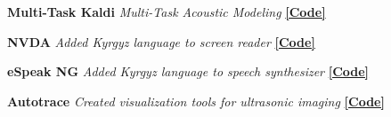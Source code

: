 \documentclass{resume} %
\begin{document}
{\textbf{Multi-Task Kaldi}} {\hfill \textit{Multi-Task Acoustic Modeling} {\hspace{2.5cm} \href{https://github.com/JRMeyer/multi-task-kaldi}{\textbf{[Code]}}}} \\\vspace{-.35cm}

{\textbf{NVDA}} {\hfill \textit{Added Kyrgyz language to screen reader} {\hspace{2.5cm} \href{https://github.com/JRMeyer/nvda}{\textbf{[Code]}}}} \\\vspace{-.35cm}

{\textbf{eSpeak NG}} {\hfill \textit{Added Kyrgyz language to speech synthesizer} {\hspace{2.5cm} \href{https://github.com/rhdunn/espeak/commits?author=JRMeyer}{\textbf{[Code]}}}}\\\vspace{-.35cm}

{\textbf{Autotrace}} {\hfill \textit{Created visualization tools for ultrasonic imaging} {\hspace{2.5cm} \href{https://github.com/JRMeyer/Autotrace}{\textbf{[Code]}}}} \\













%
%
%
%
%
%
\end{document}
